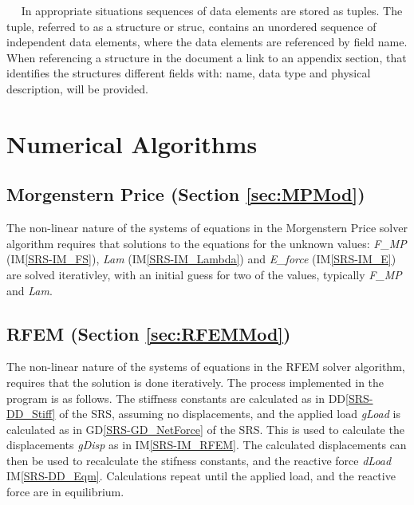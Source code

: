 \documentclass[12pt, titlepage]{article}
\begin{document}
~\newline~\newline\noindent
In appropriate situations sequences of data elements are stored as
tuples. The tuple, referred to as a structure or struc, contains an unordered
sequence of independent data elements, where the data elements are
referenced by field name. When referencing a structure in the document
a link to an appendix section, that identifies the structures different
fields with: name, data type and physical description, will be
provided.


\section{Numerical Algorithms}

\subsection*{Morgenstern Price (Section \ref{sec:MPMod})}
The non-linear nature of the systems of equations in the Morgenstern
Price solver algorithm requires that solutions to the equations for
the unknown values: \textit{F\_MP} (IM\ref{SRS-IM_FS}), \textit{Lam}
(IM\ref{SRS-IM_Lambda}) and \textit{E\_force} (IM\ref{SRS-IM_E}) are
solved iterativley, with an initial guess for two of the values,
typically \textit{F\_MP} and \textit{Lam}.

\subsection*{RFEM (Section \ref{sec:RFEMMod})}
The non-linear nature of the systems of equations in the RFEM solver
algorithm, requires that the solution is done iteratively. The
process implemented in the program is as follows. The stiffness
constants are calculated as in DD\ref{SRS-DD_Stiff} of the SRS,
assuming no displacements, and the applied load \textit{gLoad} is
calculated as in GD\ref{SRS-GD_NetForce} of the SRS. This is used to
calculate the displacements \textit{gDisp} as in
IM\ref{SRS-IM_RFEM}. The calculated displacements can then be used to
recalculate the stifness constants, and the reactive force
\textit{dLoad} IM\ref{SRS-DD_Eqm}. Calculations repeat until the
applied load, and the reactive force are in equilibrium.
\end{document}
